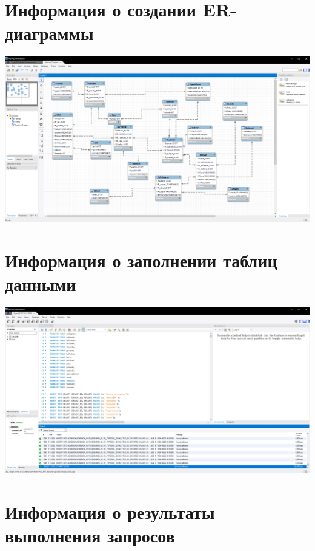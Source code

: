 \documentclass[a4paper, 12pt]{article}
\begin{document}
\newpage
\section{Информация о создании ER-диаграммы}
\includegraphics[width=\textwidth]{3.png}

\section{Информация о заполнении таблиц данными}
\includegraphics[width=\textwidth]{4.png}

\newpage
\section{Информация о результаты выполнения запросов}
\end{document}
